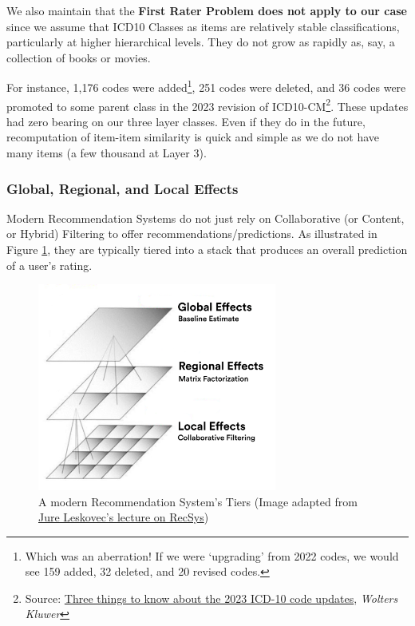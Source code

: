 \documentclass[twoside,11pt]{article}
\begin{document}
We also maintain that the \textbf{First Rater Problem does not apply to our case} since we assume that ICD10 Classes as items are relatively stable classifications, particularly at higher hierarchical levels. They do not grow as rapidly as, say, a collection of books or movies.

For instance, 1,176 codes were added\footnote{Which was an aberration! If we were `upgrading' from 2022 codes, we would see 159 added, 32 deleted, and 20 revised codes.}, 251 codes were deleted, and 36 codes were promoted to some parent class in the 2023 revision of ICD10-CM\footnote{Source: \href{https://www.wolterskluwer.com/en/expert-insights/2023-icd10-code-updates}{Three things to know about the 2023 ICD-10 code updates}, \textit{Wolters Kluwer}}. These updates had zero bearing on our three layer classes. Even if they do in the future, recomputation of item-item similarity is quick and simple as we do not have many items (a few thousand at Layer 3).


\newpage
\subsubsection{Global, Regional, and Local Effects}

Modern Recommendation Systems do not just rely on Collaborative (or Content, or Hybrid) Filtering to offer recommendations/predictions. As illustrated in Figure \ref{fig:effects}, they are typically tiered into a stack that produces an overall prediction of a user's rating.

\begin{figure}[H]
	\centering
  \includegraphics[width=0.7\textwidth]{./images/global-regional-local.png}
  \caption{A modern Recommendation System's Tiers (Image adapted from \href{http://snap.stanford.edu/class/cs246-2015/slides/08-recsys2.pdf}{Jure Leskovec's lecture on RecSys})}
  \label{fig:effects}
\end{figure}
\end{document}
